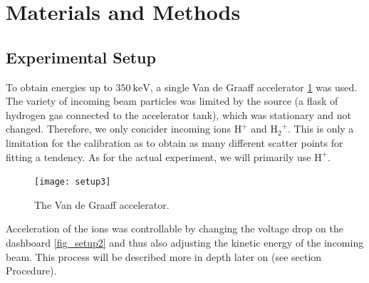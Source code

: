 \section{Materials and Methods}
\subsection{Experimental Setup}
To obtain energies up to $\SI{350}{\kilo\electronvolt}$, a single
Van de Graaff accelerator \cref{fig_setup3} was used. The variety of incoming
beam particles was limited by the source (a flask of hydrogen gas connected to
the accelerator tank), which was stationary and not changed. Therefore, we only
concider incoming ions $\mathrm{H^+}$ and $\mathrm{{H_2}^{+}}$. This is only a
limitation for the calibration as to obtain as many different scatter points for
fitting a tendency. As for the actual experiment, we will primarily use
$\mathrm{H^{+}}$.
%
\begin{figure}[t]
    \centering
    \texttt{[image: setup3]}
    \caption{The Van de Graaff accelerator.}
    \label{fig_setup3}
\end{figure}
%
Acceleration of the ions was controllable by changing the voltage drop on the
dashboard \cref{fig_setup2} and thus also adjusting the kinetic energy of the
incoming beam. This process will be described more in depth later on (see section Procedure).

